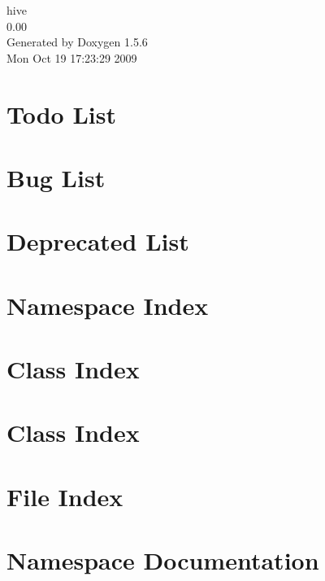 \documentclass[a4paper]{book}
\begin{document}
\begin{titlepage}
\vspace*{7cm}
\begin{center}
{\Large hive \\[1ex]\large 0.00 }\\
\vspace*{1cm}
{\large Generated by Doxygen 1.5.6}\\
\vspace*{0.5cm}
{\small Mon Oct 19 17:23:29 2009}\\
\end{center}
\end{titlepage}
\clearemptydoublepage
{}
\tableofcontents
\clearemptydoublepage
{}
\chapter{Todo List}
\label{todo}

\chapter{Bug List}
\label{bug}

\chapter{Deprecated List}
\label{deprecated}

\chapter{Namespace Index}

\chapter{Class Index}

\chapter{Class Index}

\chapter{File Index}

\chapter{Namespace Documentation}




\end{document}
